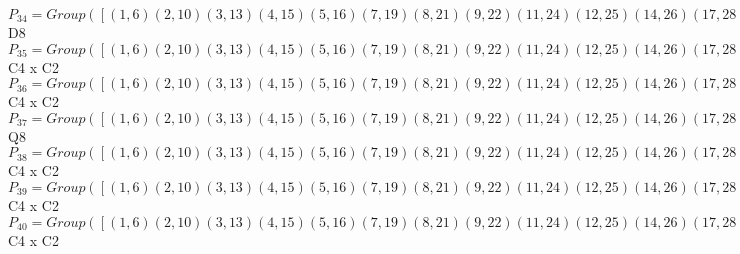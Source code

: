 \documentclass[varwidth=\maxdimen,border=10]{standalone}
\begin{document}
\begin{tabular}
$P_{34} = Group( [ ( 1, 6)( 2,10)( 3,13)( 4,15)( 5,16)( 7,19)( 8,21)( 9,22)(11,24)(12,25)(14,26)(17,28)(18,29)(20,30)(23,31)(27,32), ( 1, 5)( 2, 9)( 3,12)( 4,14)( 6,16)( 7,18)( 8,20)(10,22)(11,23)(13,25)(15,26)(17,27)(19,29)(21,30)(24,31)(28,32), ( 1,19)( 2,13)( 3,10)( 4,17)( 5,18)( 6, 7)( 8,11)( 9,12)(14,32)(15,28)(16,29)(20,31)(21,24)(22,25)(23,30)(26,27) ] )\cong$ D8\ \\
$P_{35} = Group( [ ( 1, 6)( 2,10)( 3,13)( 4,15)( 5,16)( 7,19)( 8,21)( 9,22)(11,24)(12,25)(14,26)(17,28)(18,29)(20,30)(23,31)(27,32), ( 1,22, 6, 9)( 2,16,10, 5)( 3,18,13,29)( 4,30,15,20)( 7,12,19,25)( 8,26,21,14)(11,27,24,32)(17,23,28,31), ( 1,19)( 2,13)( 3,10)( 4,17)( 5,18)( 6, 7)( 8,11)( 9,12)(14,32)(15,28)(16,29)(20,31)(21,24)(22,25)(23,30)(26,27) ] )\cong$ C4 x C2\ \\
$P_{36} = Group( [ ( 1, 6)( 2,10)( 3,13)( 4,15)( 5,16)( 7,19)( 8,21)( 9,22)(11,24)(12,25)(14,26)(17,28)(18,29)(20,30)(23,31)(27,32), ( 1,12, 6,25)( 2,18,10,29)( 3,16,13, 5)( 4,31,15,23)( 7,22,19, 9)( 8,32,21,27)(11,14,24,26)(17,20,28,30), ( 1, 2)( 3,19)( 4, 8)( 5,22)( 6,10)( 7,13)( 9,16)(11,28)(12,18)(14,30)(15,21)(17,24)(20,26)(23,27)(25,29)(31,32) ] )\cong$ C4 x C2\ \\
$P_{37} = Group( [ ( 1, 6)( 2,10)( 3,13)( 4,15)( 5,16)( 7,19)( 8,21)( 9,22)(11,24)(12,25)(14,26)(17,28)(18,29)(20,30)(23,31)(27,32), ( 1, 4, 6,15)( 2, 8,10,21)( 3,11,13,24)( 5,14,16,26)( 7,17,19,28)( 9,20,22,30)(12,23,25,31)(18,27,29,32), ( 1, 3, 6,13)( 2, 7,10,19)( 4,24,15,11)( 5,12,16,25)( 8,28,21,17)( 9,18,22,29)(14,31,26,23)(20,32,30,27) ] )\cong$ Q8\ \\
$P_{38} = Group( [ ( 1, 6)( 2,10)( 3,13)( 4,15)( 5,16)( 7,19)( 8,21)( 9,22)(11,24)(12,25)(14,26)(17,28)(18,29)(20,30)(23,31)(27,32), ( 1, 8, 6,21)( 2, 4,10,15)( 3,28,13,17)( 5,30,16,20)( 7,24,19,11)( 9,26,22,14)(12,27,25,32)(18,23,29,31), ( 1, 3, 6,13)( 2, 7,10,19)( 4,24,15,11)( 5,12,16,25)( 8,28,21,17)( 9,18,22,29)(14,31,26,23)(20,32,30,27) ] )\cong$ C4 x C2\ \\
$P_{39} = Group( [ ( 1, 6)( 2,10)( 3,13)( 4,15)( 5,16)( 7,19)( 8,21)( 9,22)(11,24)(12,25)(14,26)(17,28)(18,29)(20,30)(23,31)(27,32), ( 1, 4, 6,15)( 2, 8,10,21)( 3,11,13,24)( 5,14,16,26)( 7,17,19,28)( 9,20,22,30)(12,23,25,31)(18,27,29,32), ( 1, 2)( 3,19)( 4, 8)( 5,22)( 6,10)( 7,13)( 9,16)(11,28)(12,18)(14,30)(15,21)(17,24)(20,26)(23,27)(25,29)(31,32) ] )\cong$ C4 x C2\ \\
$P_{40} = Group( [ ( 1, 6)( 2,10)( 3,13)( 4,15)( 5,16)( 7,19)( 8,21)( 9,22)(11,24)(12,25)(14,26)(17,28)(18,29)(20,30)(23,31)(27,32), ( 1, 8, 6,21)( 2, 4,10,15)( 3,28,13,17)( 5,30,16,20)( 7,24,19,11)( 9,26,22,14)(12,27,25,32)(18,23,29,31), ( 1,19)( 2,13)( 3,10)( 4,17)( 5,18)( 6, 7)( 8,11)( 9,12)(14,32)(15,28)(16,29)(20,31)(21,24)(22,25)(23,30)(26,27) ] )\cong$ C4 x C2\ \\

\end{tabular}
\end{document}
